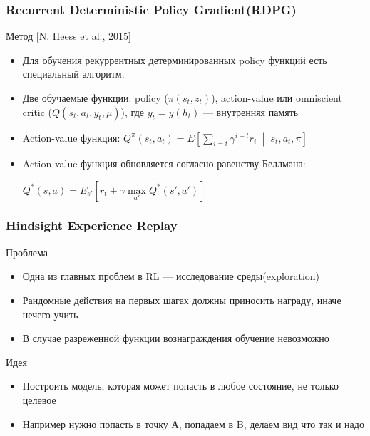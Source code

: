 \documentclass[fleqn, xcolor=x11names]{beamer}
\begin{document}
\begin{frame}\frametitle{Recurrent Deterministic Policy Gradient(RDPG)}

\begin{block}{{\footnotesize Метод [N. Heess et al., 2015]}}
{\footnotesize 
\begin{itemize}
\item Для обучения рекуррентных детерминированных policy функций есть специальный алгоритм.
\item Две обучаемые функции: policy ($\pi(s_t, z_t)$), action-value или omniscient critic ($Q(s_t, a_t, y_t, \mu)$), где $y_t = y(h_t)$ --- внутренняя память
\item Action-value функция: $ Q^{\pi}(s_t,a_t)= E\left[ \sum \limits_{i=t} \gamma^{i-t} r_{i} \;\middle|\; s_t, a_t, \pi\right] $
\item Action-value функция обновляется согласно равенству Беллмана:
\begin{center}
$Q^*(s,a)= E_{s'}\left[  r_t + \gamma \max\limits_{a'} Q^*(s',a') \right]$
\end{center}
\end{itemize}

}
\end{block}

\end{frame}

\begin{frame}\frametitle{Hindsight Experience Replay}
{\footnotesize
\begin{block}{Проблема}

\begin{itemize}
\item Одна из главных проблем в RL --- исследование среды(exploration)
\item Рандомные действия на первых шагах должны приносить награду, иначе нечего учить
\item В случае разреженной функции вознаграждения обучение невозможно
\end{itemize}

\end{block}

\begin{block}{Идея}
\begin{itemize}
\item Построить модель, которая может попасть в любое состояние, не только целевое
\item Например нужно попасть в точку А, попадаем в B, делаем вид что так и надо
\end{itemize}
\end{block}
}
\end{frame}
\end{document}
